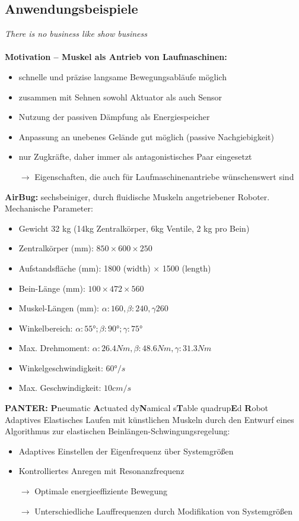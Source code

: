 \subsection{Anwendungsbeispiele}
\emph{There is no business like show business}\\ \\
\textbf{Motivation – Muskel als Antrieb von Laufmaschinen:}
\begin{itemize}
	\item schnelle und präzise langsame Bewegungsabläufe möglich
	\item zusammen mit Sehnen sowohl Aktuator als auch Sensor
	\item Nutzung der passiven Dämpfung als Energiespeicher
	\item Anpassung an unebenes Gelände gut möglich (passive Nachgiebigkeit)
	\item nur Zugkräfte, daher immer als antagonistisches Paar eingesetzt
	\item[$\rightarrow$] Eigenschaften, die auch für Laufmaschinenantriebe wünschenswert sind
\end{itemize}
\textbf{AirBug:} sechsbeiniger, durch fluidische Muskeln angetriebener Roboter.\\
Mechanische Parameter:
\begin{itemize}
	\setlength\itemsep{0em}
	\item Gewicht 32 kg (14kg Zentralkörper, 6kg Ventile, 2 kg pro Bein)
	\item Zentralkörper (mm): $850 \times 600 \times 250$
	\item Aufstandsfläche (mm): 1800 (width) $\times$ 1500 (length)
	\item Bein-Länge (mm): $100 \times 472 \times 560$
	\item Muskel-Längen (mm): $\alpha: 160, \beta: 240, \gamma 260$
	\item Winkelbereich: $\alpha: 55°; \beta: 90°; \gamma: 75°$
	\item Max. Drehmoment: $\alpha: 26.4Nm, \beta: 48.6Nm, \gamma: 31.3Nm$
	\item Winkelgeschwindigkeit: $60°/s$
	\item Max. Geschwindigkeit: $10cm/s$
\end{itemize}
\textbf{PANTER:} \textbf{P}neumatic \textbf{A}ctuated dy\textbf{N}amical s\textbf{T}able quadrup\textbf{E}d \textbf{R}obot\\
Adaptives Elastisches Laufen mit künstlichen Muskeln durch den Entwurf eines Algorithmus zur elastischen Beinlängen-Schwingungsregelung:
\begin{itemize}
	\item Adaptives Einstellen der Eigenfrequenz über Systemgrößen
	\item Kontrolliertes Anregen mit Resonanzfrequenz
	\item[$\rightarrow$] Optimale energieeffiziente Bewegung
	\item[$\rightarrow$] Unterschiedliche Lauffrequenzen durch Modifikation von
Systemgrößen
\end{itemize}

